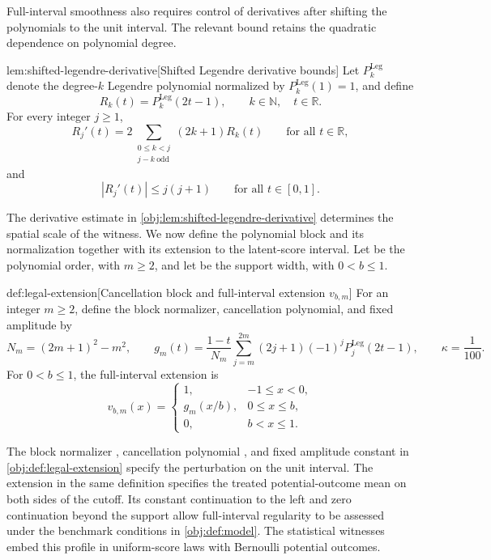 Full-interval smoothness also requires control of derivatives after shifting the polynomials to the unit interval. The relevant bound retains the quadratic dependence on polynomial degree.

\begin{lemmav}{lem:shifted-legendre-derivative}[Shifted Legendre derivative bounds]
Let \(P_k^{\mathrm{Leg}}\) denote the degree-\(k\) Legendre polynomial normalized by \(P_k^{\mathrm{Leg}}(1)=1\), and define
\[
R_k(t)=P_k^{\mathrm{Leg}}(2t-1),\qquad k\in\mathbb N,\quad t\in\mathbb R.
\]
For every integer \(j\ge1\),
\[
R_j'(t)=2\sum_{\substack{0\le k<j\\j-k\ \mathrm{odd}}}(2k+1)R_k(t)
\qquad\text{for all }t\in\mathbb R,
\]
and
\[
|R_j'(t)|\le j(j+1)
\qquad\text{for all }t\in[0,1].
\]
\end{lemmav}

The derivative estimate in \cref{obj:lem:shifted-legendre-derivative} determines the spatial scale of the witness. We now define the polynomial block and its normalization together with its extension to the latent-score interval. Let  be the polynomial order, with \(m\ge2\), and let  be the support width, with \(0<b\le1\).

\begin{definitionv}{def:legal-extension}[Cancellation block and full-interval extension $v_{b,m}$]
For an integer \(m\ge2\), define the block normalizer, cancellation polynomial, and fixed amplitude by
\[
N_m=(2m+1)^2-m^2,
\qquad
g_m(t)=\frac{1-t}{N_m}
\sum_{j=m}^{2m}(2j+1)(-1)^jP_j^{\mathrm{Leg}}(2t-1),
\qquad
\kappa=\frac1{100}.
\]
For \(0<b\le1\), the full-interval extension is
\[
v_{b,m}(x)
=
\begin{cases}
1, & -1\le x<0,\\
g_m(x/b), & 0\le x\le b,\\
0, & b<x\le1.
\end{cases}
\]
\end{definitionv}

The block normalizer , cancellation polynomial , and fixed amplitude constant  in \cref{obj:def:legal-extension} specify the perturbation on the unit interval. The extension  in the same definition specifies the treated potential-outcome mean on both sides of the cutoff. Its constant continuation to the left and zero continuation beyond the support allow full-interval regularity to be assessed under the benchmark conditions in \cref{obj:def:model}. The statistical witnesses embed this profile in uniform-score laws with Bernoulli potential outcomes.

